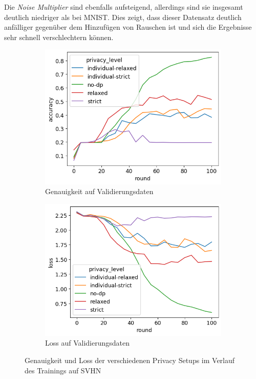 Die \textit{Noise Multiplier} sind ebenfalls aufsteigend, allerdings sind sie insgesamt deutlich niedriger als bei MNIST. Dies zeigt, dass dieser Datensatz deutlich anfälliger gegenüber dem Hinzufügen von Rauschen ist und sich die Ergebnisse sehr schnell verschlechtern können.

\begin{figure}
	\centering
	\begin{subfigure}{0.45\textwidth}
		\centering
		\includegraphics[width=\textwidth]{Bilder/svhn-accuracy.png}
		\caption{Genauigkeit auf Validierungsdaten}
	\end{subfigure}
	\begin{subfigure}{0.45\textwidth}
		\centering
		\includegraphics[width=\textwidth]{Bilder/svhn-loss.png}
		\caption{Loss auf Validierungsdaten}
	\end{subfigure}
	\caption{Genauigkeit und Loss der verschiedenen Privacy Setups im Verlauf des Trainings auf SVHN}
	\label{fig:fed-svhn-results}
\end{figure}

